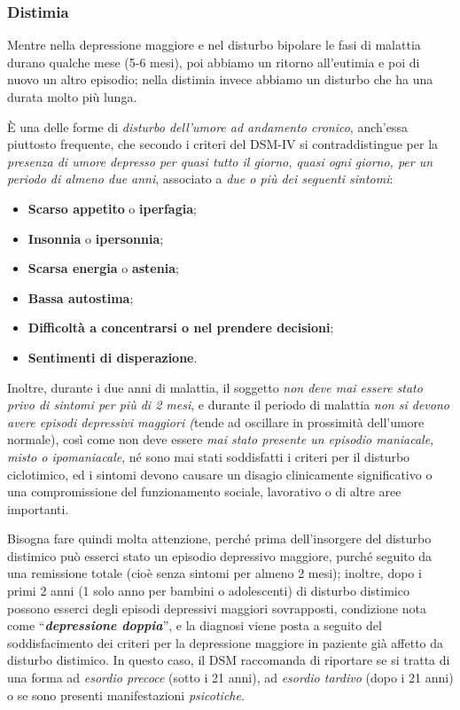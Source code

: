 \subsubsection{Distimia}

Mentre nella depressione maggiore e nel disturbo bipolare le fasi di
malattia durano qualche mese (5-6 mesi), poi abbiamo un ritorno
all'eutimia e poi di nuovo un altro episodio; nella distimia invece
abbiamo un disturbo che ha una durata molto più lunga.

È una delle forme di \emph{disturbo dell'umore ad andamento cronico},
anch'essa piuttosto frequente, che secondo i criteri del DSM-IV si
contraddistingue per la \emph{presenza di umore depresso per quasi tutto
il giorno, quasi ogni giorno, per un periodo di almeno due anni},
associato a \emph{due o più dei seguenti sintomi}:

\begin{itemize}
\item
  \textbf{Scarso appetito} o \textbf{iperfagia};
\item
  \textbf{Insonnia} o \textbf{ipersonnia};
\item
  \textbf{Scarsa energia} o \textbf{astenia};
\item
  \textbf{Bassa autostima};
\item
  \textbf{Difficoltà a concentrarsi o nel prendere decisioni};
\item
  \textbf{Sentimenti di disperazione}.
\end{itemize}

Inoltre, durante i due anni di malattia, il soggetto \emph{non deve mai
essere stato privo di sintomi per più di 2 mesi}, e durante il periodo
di malattia \emph{non si devono avere episodi depressivi maggiori
(}tende ad oscillare in prossimità dell'umore normale), così come non
deve essere \emph{mai stato presente un episodio maniacale, misto o
ipomaniacale}, né sono mai stati soddisfatti i criteri per il disturbo
ciclotimico, ed i sintomi devono causare un disagio clinicamente
significativo o una compromissione del funzionamento sociale, lavorativo
o di altre aree importanti.

Bisogna fare quindi molta attenzione, perché prima dell'insorgere del
disturbo distimico può esserci stato un episodio depressivo maggiore,
purché seguito da una remissione totale (cioè senza sintomi per almeno 2
mesi); inoltre, dopo i primi 2 anni (1 solo anno per bambini o
adolescenti) di disturbo distimico possono esserci degli episodi
depressivi maggiori sovrapposti, condizione nota come
``\textbf{\emph{depressione doppia}}'', e la diagnosi viene posta a
seguito del soddisfacimento dei criteri per la depressione maggiore in
paziente già affetto da disturbo distimico. In questo caso, il DSM
raccomanda di riportare se si tratta di una forma ad \emph{esordio
precoce} (sotto i 21 anni), ad \emph{esordio tardivo} (dopo i 21 anni) o
se sono presenti manifestazioni \emph{psicotiche}.

